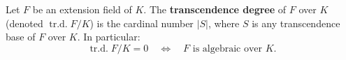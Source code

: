 Let $F$ be an extension field of $K$. The \textbf{transcendence degree} of $F$ over $K$ (denoted $\operatorname{tr.d.} F/K$) is the cardinal number $|S|$, where $S$ is any transcendence base of $F$ over $K$.
In particular:
\[
\operatorname{tr.d.} F/K = 0 \quad\Longleftrightarrow\quad F \text{ is algebraic over } K.
\]
